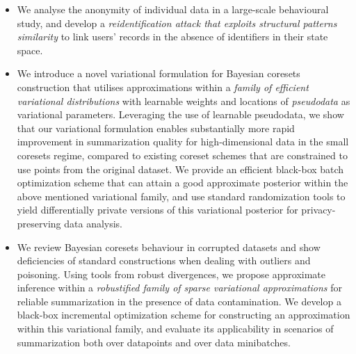 \begin{itemize}
	\item We analyse the anonymity of individual data in a large-scale behavioural study, and develop a \emph{reidentification attack that exploits structural patterns similarity} to link users' records in the absence of identifiers in their state space.
	\item We introduce a novel variational formulation for Bayesian coresets construction that utilises approximations within a \emph{family of efficient variational distributions} with learnable weights and locations of \emph{pseudodata} as variational parameters.
	 Leveraging the use of learnable pseudodata, we show that our variational formulation enables substantially more rapid improvement in summarization quality for high-dimensional data in the small coresets regime, compared to existing coreset schemes that are constrained to use points from the original dataset. 
	 We provide an efficient black-box batch optimization scheme that can attain a good approximate posterior within the above mentioned variational family, and use standard randomization tools to yield differentially private versions of this variational posterior for privacy-preserving data analysis.
	\item We review Bayesian coresets behaviour in corrupted datasets and show deficiencies of standard constructions when dealing with outliers and poisoning.
	 Using tools from robust divergences, we propose approximate inference within a \emph{robustified family of sparse variational approximations} for reliable summarization in the presence of data contamination.
	 We develop a black-box incremental optimization scheme for constructing an approximation within this variational family, and evaluate its applicability in scenarios of summarization both over datapoints and over data minibatches.
\end{itemize}

